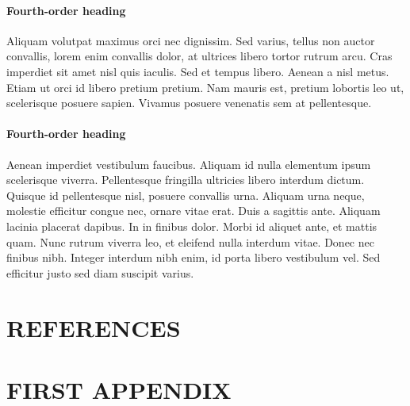 \documentclass[tm]{ornltm} %
\begin{document}
\paragraph{Fourth-order heading}

Aliquam volutpat maximus orci nec dignissim. Sed varius, tellus non auctor
convallis, lorem enim convallis dolor, at ultrices libero tortor rutrum arcu.
Cras imperdiet sit amet nisl quis iaculis. Sed et tempus libero. Aenean a nisl
metus. Etiam ut orci id libero pretium pretium. Nam mauris est, pretium lobortis
leo ut, scelerisque posuere sapien. Vivamus posuere venenatis sem at
pellentesque.

\paragraph{Fourth-order heading}

Aenean imperdiet vestibulum faucibus. Aliquam id nulla elementum ipsum
scelerisque viverra. Pellentesque fringilla ultricies libero interdum dictum.
Quisque id pellentesque nisl, posuere convallis urna. Aliquam urna neque,
molestie efficitur congue nec, ornare vitae erat. Duis a sagittis ante. Aliquam
lacinia placerat dapibus. In in finibus dolor. Morbi id aliquet ante, et mattis
quam. Nunc rutrum viverra leo, et eleifend nulla interdum vitae. Donec nec
finibus nibh. Integer interdum nibh enim, id porta libero vestibulum vel. Sed
efficitur justo sed diam suscipit varius.


\section{REFERENCES}%
\printbibliography[heading=none]%

\appendix
\acresetall %
\section{FIRST APPENDIX}
\label{sec:firstapp}
\end{document}
